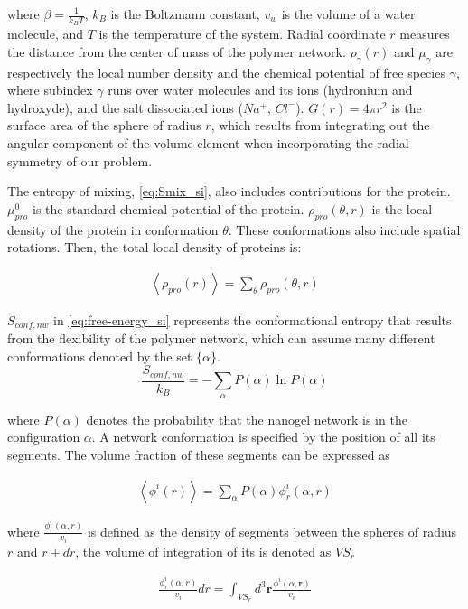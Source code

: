 \documentclass[journal=jacsat,manuscript=suppinfo]{achemso}
\begin{document}
\noindent where $\beta = \frac{1}{k_BT}$, $k_B$ is the Boltzmann constant, $v_w$ is the volume of a water molecule, and $T$ is the temperature of the system.
Radial coordinate $r$ measures the distance from the center of mass of the polymer network.
$\rho_\gamma(r)$ and $\mu_\gamma$ are respectively the local number density and the chemical potential of free species $\gamma$, where  
subindex $\gamma$ runs over water molecules and its ions (hydronium and hydroxyde), and the salt dissociated ions ($Na^+$, $Cl^-$).
$G(r)=4\pi r^2$ is the surface area of the sphere of radius $r$, which results from integrating out the angular component of the volume element when incorporating the radial symmetry of our problem.



The entropy of mixing, \cref{eq:Smix_si}, also includes contributions for the protein.
$\mu^0_{pro}$ is the standard chemical potential of the protein.
$\rho_{pro}(\theta,r)$ is the local density of the protein in conformation $\theta$.
These conformations also include spatial rotations.
Then, the total local density of proteins is:

\begin{align}
	\left<\rho_{pro}(r)\right> = \sum_\theta{\rho_{pro}(\theta,r)}
\end{align}

$S_{conf,nw}$ in \cref{eq:free-energy_si} represents the conformational entropy that results from the flexibility of the polymer network, which can assume many different conformations denoted by the set $\{\alpha\}$. 
\begin{equation}
	\frac{S_{conf,nw}}{k_B} = - \sum_{\alpha}{P(\alpha)\ln P(\alpha)}
\end{equation}

\noindent where $P(\alpha)$ denotes the probability that the nanogel network is in the configuration $\alpha$.
A network conformation is specified by the position of all its segments.
The volume fraction of these segments can be expressed as



\begin{align}
	\left< \phi^i(r)\right> = \sum_\alpha{P(\alpha)\phi^i_r(\alpha,r)} 
\end{align}

\noindent where $\frac{\phi^i_r(\alpha,r)}{v_i}$ is defined as the density of segments between the spheres of radius $r$ and $r + dr$, the volume of integration of its is denoted as $VS_r$

\begin{align}
\frac{\phi^i_r(\alpha,r)}{v_i} dr	=  \int_{VS_r} d^3\textbf{r}  \frac{\phi^i(\alpha,\textbf{r})}{v_i}
\end{align}
\end{document}
